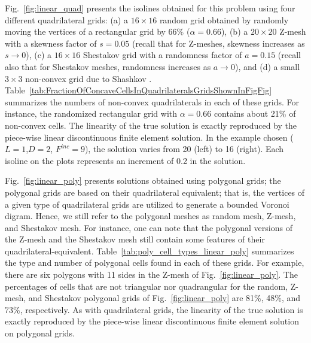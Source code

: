 \documentclass[preprint,10pt]{elsarticle}
\newcommand{\fig}[1]{Fig.~\ref{#1}}                      %
\newcommand{\tbl}[1]{Table~\ref{#1}}                     %
\begin{document}
\fig{fig:linear_quad} presents the isolines obtained for this problem using four different quadrilateral grids:
(a) a $16 \times 16$ random grid obtained by randomly moving the vertices of a rectangular grid by 66\% ($\alpha=0.66$), 
(b) a $20 \times 20$ Z-mesh with a skewness factor of $s=0.05$ (recall that for Z-meshes, skewness increases
as $s\to 0$), 
(c) a $16 \times 16$ Shestakov grid  with a randomness factor of $a=0.15$ (recall also that for Shestakov meshes, 
randomness increases as $a\to 0$), and 
(d) a small $3 \times 3$ non-convex grid due to Shashkov \cite{ShashkovSteinberg1996}.
\tbl{tab:FractionOfConcaveCellsInQuadrilateralsGridsShownInFigFig} summarizes the numbers of non-convex quadrilaterals in each of these grids.  For instance, the randomized rectangular grid with $\alpha=0.66$ contains about 21\% of non-convex cells. 
The linearity of the true solution is exactly reproduced by the piece-wise linear discontinuous finite element solution. In the example chosen ($L=1$,$D=2$, $F^{inc}=9$), the solution varies from 20 (left) to 16 (right). Each isoline on the plots represents an increment of 0.2 in the solution.

\fig{fig:linear_poly} presents solutions obtained using polygonal grids; the polygonal grids are based on their quadrilateral equivalent; that is, the vertices of a given type of quadrilateral grids are utilized to generate a bounded Voronoi digram. Hence, we still refer to the polygonal meshes as random mesh, Z-mesh, and Shestakov mesh. For instance, one can note that the polygonal versions of the Z-mesh and the Shestakov mesh still contain some features of their quadrilateral-equivalent. \tbl{tab:poly_cell_types_linear_poly} summarizes the type and number of polygonal cells found in each of these grids. 
For example, there are six polygons with 11 sides in the Z-mesh of \fig{fig:linear_poly}. The percentages of cells that are not triangular nor quadrangular for the random, Z-mesh, and Shestakov polygonal grids of \fig{fig:linear_poly} are 81\%, 48\%, and 73\%, respectively. As with quadrilateral grids, the linearity of the true solution is exactly reproduced by the piece-wise linear discontinuous finite element solution on polygonal grids.
\end{document}

